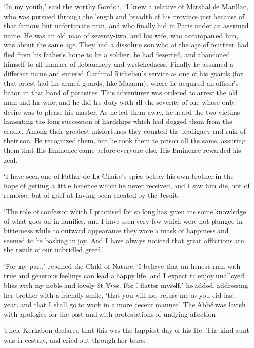 \documentclass{article}
\begin{document}
\begin{center}
`In my youth,' said the worthy Gordon, `I knew a relative of Marshal de Marillac, 
who was pursued through the length and breadth of his province just because of 
that famous but unfortunate man, and who finally hid in Paris under an assumed 
name. He was an old man of seventy-two, and his wife, who accompanied him, was 
about the same age. They had a dissolute son who at the age of fourteen had fled 
from his father's home to be a soldier; he had deserted, and abandoned himself 
to all manner of debauchery and wretchedness. Finally he assumed a different name 
and entered Cardinal Richelieu's service as one of his guards (for that priest 
had his armed guards, like Mazarin), where he acquired an officer's baton in that 
band of parasites. This adventurer was ordered to arrest the old man and his wife, 
and he did his duty with all the severity of one whose only desire was to please 
his master. As he led them away, he heard the two victims lamenting the long succession 
of hardships which had dogged them from the cradle. Among their greatest misfortunes 
they counted the profligacy and ruin of their son. He recognized them, but he took 
them to prison all the same, assuring them that His Eminence came before everyone 
else. His Eminence rewarded his zeal. 

`I have seen one of Father de La Chaise's spies betray his own brother in the hope 
of getting a little benefice which he never received, and I saw him die, not of 
remorse, but of grief at having been cheated by the Jesuit. 

`The role of confessor which I practised for so long has given me some knowledge 
of what goes on in families, and I have seen very few which were not plunged in 
bitterness while to outward appearance they wore a mask of happiness and seemed 
to be basking in joy. And I have always noticed that great afflictions are the 
result of our unbridled greed.' 

`For my part,' rejoined the Child of Nature, `I believe that an honest man with 
true and generous feelings can lead a happy life, and I expect to enjoy unalloyed 
bliss with my noble and lovely St Yves. For I flatter myself,' he added, addressing 
her brother with a friendly smile, `that you will not refuse me as you did last 
year, and that I shall go to work in a more decent manner.' The Abbé was lavish 
with apologies for the past and with protestations of undying affection. 

Uncle Kerkabon declared that this was the happiest day of his life. The kind aunt 
was in ecstasy, and cried out through her tears: 


\end{center}
\end{document}
